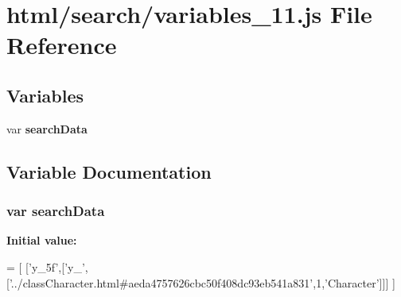 \section{html/search/variables\-\_\-11.js File Reference}
\label{variables__11_8js}
\subsection*{Variables}
\begin{DoxyCompactItemize}
\item 
var {\bf search\-Data}
\end{DoxyCompactItemize}


\subsection{Variable Documentation}
\subsubsection[{search\-Data}]{\setlength{\rightskip}{0pt plus 5cm}var search\-Data}\label{variables__11_8js_ad01a7523f103d6242ef9b0451861231e}
{\bfseries Initial value\-:}
\begin{DoxyCode}
=
[
  [\textcolor{stringliteral}{'y\_5f'},[\textcolor{stringliteral}{'y\_'},[\textcolor{stringliteral}{'../classCharacter.html#aeda4757626cbc50f408dc93eb541a831'},1,\textcolor{stringliteral}{'Character'}]]]
]
\end{DoxyCode}
